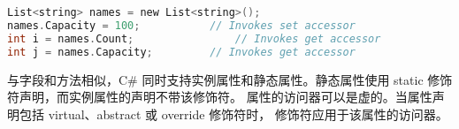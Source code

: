 \begin{lstlisting}[language=C] 
List<string> names = new List<string>();
names.Capacity = 100;           // Invokes set accessor
int i = names.Count;                // Invokes get accessor
int j = names.Capacity;         // Invokes get accessor
 \end{lstlisting}

与字段和方法相似，C\# 同时支持实例属性和静态属性。静态属性使用 static 修饰符声明，而实例属性的声明不带该修饰符。
属性的访问器可以是虚的。当属性声明包括 virtual、abstract 或 override 修饰符时，
修饰符应用于该属性的访问器。

 
